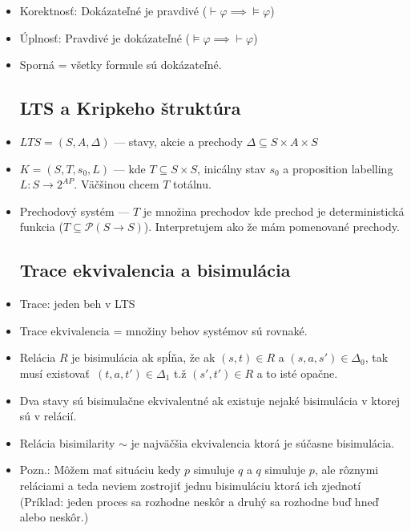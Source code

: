 \documentclass[paper=a4, fontsize=11pt]{scrartcl} %
\numberwithin{equation}{section} %
\numberwithin{figure}{section} %
\numberwithin{table}{section} %
\begin{document}
\begin{itemize}
	\item Korektnosť: Dokázateľné je pravdivé ($\vdash \varphi \implies \models \varphi$)
	
	\item Úplnosť: Pravdivé je dokázateľné ($\models \varphi \implies \vdash \varphi$)
	
	\item Sporná = všetky formule sú dokázateľné.
	
	\subsection{LTS a Kripkeho štruktúra}
	
	\item $LTS = (S, A, \Delta)$ — stavy, akcie a prechody $\Delta \subseteq S \times A \times S$
	
	\item $K = (S, T, s_0, L)$ — kde $T \subseteq S \times S$, inicálny stav $s_0$ a proposition labelling $L: S \to 2^{AP}$. Väčšinou chcem $T$ totálnu.
	
	\item Prechodový systém — $T$ je množina prechodov kde prechod je deterministická funkcia ($T \subseteq \mathcal{P}(S \to S)$). Interpretujem ako že mám pomenované prechody.
	
	\subsection{Trace ekvivalencia a bisimulácia}
	
	\item Trace: jeden beh v LTS
	
	\item Trace ekvivalencia = množiny behov systémov sú rovnaké.
	
	\item Relácia $R$ je bisimulácia ak spĺňa, že ak $(s,t) \in R$ a $(s, a, s') \in \Delta_0$, tak musí existovať $(t, a, t') \in \Delta_1$ t.ž $(s', t') \in R$ a to isté opačne.
	
	\item Dva stavy sú bisimulačne ekvivalentné ak existuje nejaké bisimulácia v ktorej sú v relácií. 
	
	\item Relácia bisimilarity $\sim$ je najväčšia ekvivalencia ktorá je súčasne bisimulácia.
	
	\item Pozn.: Môžem mať situáciu kedy $p$ simuluje $q$ a $q$ simuluje $p$, ale rôznymi reláciami a teda neviem zostrojiť jednu bisimuláciu ktorá ich zjednotí (Príklad: jeden proces sa rozhodne neskôr a druhý sa rozhodne buď hneď alebo neskôr.)
	

\end{itemize}
\end{document}
